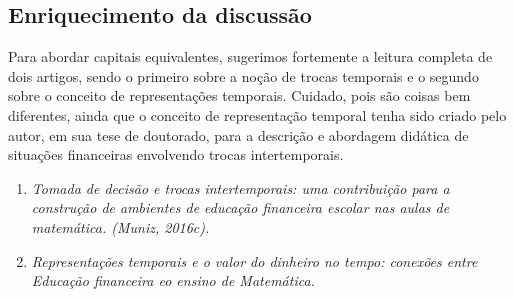 \begin{paginatexto}
\section{Enriquecimento da discussão}

Para abordar capitais equivalentes, sugerimos fortemente a leitura completa de dois artigos, sendo o primeiro sobre a noção de trocas temporais e o segundo sobre o conceito de representações temporais. Cuidado, pois são coisas bem diferentes, ainda que o conceito de representação temporal tenha sido criado pelo autor, em sua tese de doutorado, para a descrição e abordagem didática de situações financeiras envolvendo trocas intertemporais.

\begin{enumerate}
  \item \textit{Tomada de decisão e trocas intertemporais: uma contribuição para a construção de ambientes de educação financeira escolar nas aulas de matemática. (Muniz, 2016c).}

  \item \textit{Representações temporais e o valor do dinheiro no tempo: conexões entre Educação financeira eo ensino de Matemática.}
\end{enumerate}


\end{paginatexto}
